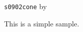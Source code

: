 \documentclass{article}
\begin{document}
\verb|s0902cone| by \ketcindy
\vspace{5mm}

This is a simple sample.


\end{document}
